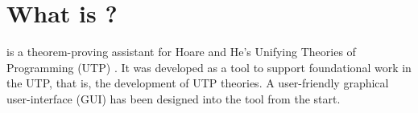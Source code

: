 \section{What is ?}

 is a theorem-proving assistant for Hoare and He's Unifying Theories of Programming (UTP) \cite{UTP-book}.
It was developed as a tool to support foundational work in the UTP,
that is, the development of UTP theories.
A user-friendly graphical user-interface (GUI)
has been designed into the tool from the start. 